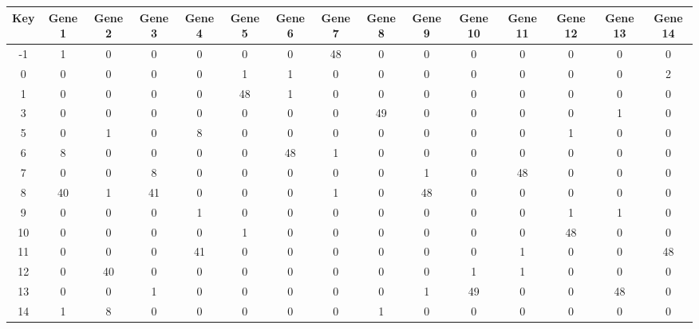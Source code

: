 \begin{tabular}{|c|c|c|c|c|c|c|c|c|c|c|c|c|c|c|}
\hline
Key & Gene 1 & Gene 2 & Gene 3 & Gene 4 & Gene 5 & Gene 6 & Gene 7 & Gene 8 & Gene 9 & Gene 10 & Gene 11 & Gene 12 & Gene 13 & Gene 14 \\
\hline
-1 & 1 & 0 & 0 & 0 & 0 & 0 & 48 & 0 & 0 & 0 & 0 & 0 & 0 & 0 \\
0 & 0 & 0 & 0 & 0 & 1 & 1 & 0 & 0 & 0 & 0 & 0 & 0 & 0 & 2 \\
1 & 0 & 0 & 0 & 0 & 48 & 1 & 0 & 0 & 0 & 0 & 0 & 0 & 0 & 0 \\
3 & 0 & 0 & 0 & 0 & 0 & 0 & 0 & 49 & 0 & 0 & 0 & 0 & 1 & 0 \\
5 & 0 & 1 & 0 & 8 & 0 & 0 & 0 & 0 & 0 & 0 & 0 & 1 & 0 & 0 \\
6 & 8 & 0 & 0 & 0 & 0 & 48 & 1 & 0 & 0 & 0 & 0 & 0 & 0 & 0 \\
7 & 0 & 0 & 8 & 0 & 0 & 0 & 0 & 0 & 1 & 0 & 48 & 0 & 0 & 0 \\
8 & 40 & 1 & 41 & 0 & 0 & 0 & 1 & 0 & 48 & 0 & 0 & 0 & 0 & 0 \\
9 & 0 & 0 & 0 & 1 & 0 & 0 & 0 & 0 & 0 & 0 & 0 & 1 & 1 & 0 \\
10 & 0 & 0 & 0 & 0 & 1 & 0 & 0 & 0 & 0 & 0 & 0 & 48 & 0 & 0 \\
11 & 0 & 0 & 0 & 41 & 0 & 0 & 0 & 0 & 0 & 0 & 1 & 0 & 0 & 48 \\
12 & 0 & 40 & 0 & 0 & 0 & 0 & 0 & 0 & 0 & 1 & 1 & 0 & 0 & 0 \\
13 & 0 & 0 & 1 & 0 & 0 & 0 & 0 & 0 & 1 & 49 & 0 & 0 & 48 & 0 \\
14 & 1 & 8 & 0 & 0 & 0 & 0 & 0 & 1 & 0 & 0 & 0 & 0 & 0 & 0 \\
\hline
\end{tabular}